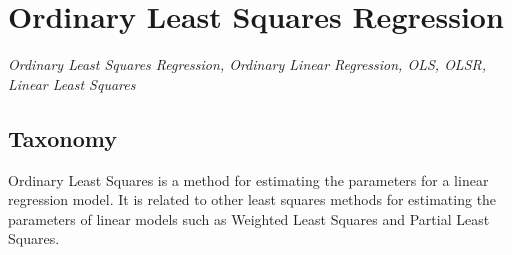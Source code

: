 
\section{Ordinary Least Squares Regression} 
\label{sec:ordinary}

\emph{Ordinary Least Squares Regression, Ordinary Linear Regression, OLS, OLSR, Linear Least Squares}

\subsection{Taxonomy}
Ordinary Least Squares is a method for estimating the parameters for a linear regression model.
It is related to other least squares methods for estimating the parameters of linear models such as Weighted Least Squares and Partial Least Squares.

